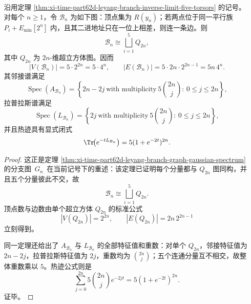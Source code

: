\begin{theorem}\label{thm:xi-time-part9zr-leyang-fivecube-spectrum}
沿用定理 \ref{thm:xi-time-part62d-leyang-branch-inverse-limit-five-torsors} 的记号。对每个 \(n\ge 1\)，令 \(\mathcal B_n\) 为如下图：顶点集为 \(R(y_n)\)；若两点位于同一平行族 \(P_i+E_{\min}[2^n]\) 内，且其二进地址只在一位上相差，则连一条边。则
\[
\mathcal B_n\cong \bigsqcup_{i=1}^{5} Q_{2n},
\]
其中 \(Q_{2n}\) 为 \(2n\)-维超立方体图。因而
\[
|V(\mathcal B_n)|=5\cdot 2^{2n}=5\cdot 4^n,
\qquad
|E(\mathcal B_n)|=5\cdot 2n\cdot 2^{2n-1}=5n\,4^n.
\]
其邻接谱满足
\[
\operatorname{Spec}(A_{\mathcal B_n})
=
\left\{
2n-2j\ \text{with multiplicity}\ 5\binom{2n}{j}:\ 0\le j\le 2n
\right\},
\]
拉普拉斯谱满足
\[
\operatorname{Spec}(L_{\mathcal B_n})
=
\left\{
2j\ \text{with multiplicity}\ 5\binom{2n}{j}:\ 0\le j\le 2n
\right\},
\]
并且热迹具有显式闭式
\[
\Tr\!\bigl(e^{-tL_{\mathcal B_n}}\bigr)
=
5(1+e^{-2t})^{2n}.
\]
\end{theorem}
\begin{proof}
这正是定理 \ref{thm:xi-time-part62d-leyang-branch-graph-gaussian-spectrum} 的分支图 \(\,G_n\,\) 在当前记号下的重述：该定理已证明每个分量都与 \(Q_{2n}\) 图同构，并且五个分量彼此不交，故
\[
\mathcal B_n\cong \bigsqcup_{i=1}^{5}Q_{2n}.
\]
顶点数与边数由单个超立方体 \(Q_{2n}\) 的标准公式
\[
|V(Q_{2n})|=2^{2n},
\qquad
|E(Q_{2n})|=2n\,2^{2n-1}
\]
立刻得到。

同一定理还给出了 \(A_{\mathcal B_n}\) 与 \(L_{\mathcal B_n}\) 的全部特征值和重数：对单个 \(Q_{2n}\)，邻接特征值为 \(2n-2j\)，拉普拉斯特征值为 \(2j\)，重数均为 \(\binom{2n}{j}\)；五个连通分量互不相交，故整体重数乘以 \(5\)。热迹公式则是
\[
\sum_{j=0}^{2n}5\binom{2n}{j}e^{-2jt}
=
5(1+e^{-2t})^{2n}.
\]
证毕。
\end{proof}

